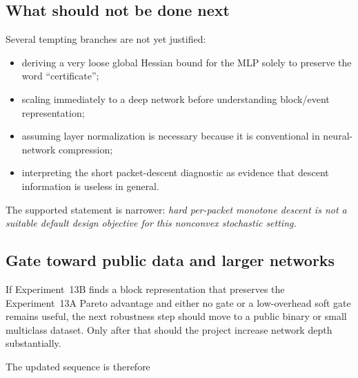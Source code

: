 \subsection{What should not be done next}

Several tempting branches are not yet justified:
\begin{itemize}
  \item deriving a very loose global Hessian bound for the MLP solely to preserve the word ``certificate'';
  \item scaling immediately to a deep network before understanding block/event representation;
  \item assuming layer normalization is necessary because it is conventional in neural-network compression;
  \item interpreting the short packet-descent diagnostic as evidence that descent information is useless in general.
\end{itemize}
The supported statement is narrower: \emph{hard per-packet monotone descent is not a suitable default design objective for this nonconvex stochastic setting.}

\subsection{Gate toward public data and larger networks}

If Experiment~13B finds a block representation that preserves the Experiment~13A Pareto advantage and either no gate or a low-overhead soft gate remains useful, the next robustness step should move to a public binary or small multiclass dataset. Only after that should the project increase network depth substantially.

The updated sequence is therefore
\begin{center}
\end{center}
